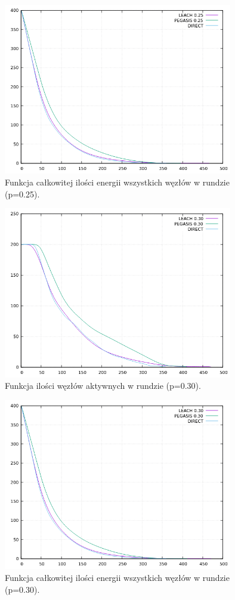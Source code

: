\documentclass[a4paper,12pt,twoside,openany]{report}
\begin{document}
\begin{figure}[H]
 \centering
 \includegraphics[width=10cm]{images/gnuplot/test_4/energy_in_round_p025.png}
 \caption{Funkcja całkowitej ilości energii wszystkich węzłów w rundzie (p=0.25).}
\end{figure}

\begin{figure}[H]
 \centering
 \includegraphics[width=10cm]{images/gnuplot/test_4/nodes_in_round_p030.png}
 \caption{Funkcja ilości węzłów aktywnych w rundzie (p=0.30).}
\end{figure}

\begin{figure}[H]
 \centering
 \includegraphics[width=10cm]{images/gnuplot/test_4/energy_in_round_p030.png}
 \caption{Funkcja całkowitej ilości energii wszystkich węzłów w rundzie (p=0.30).}
\end{figure}
\end{document}

